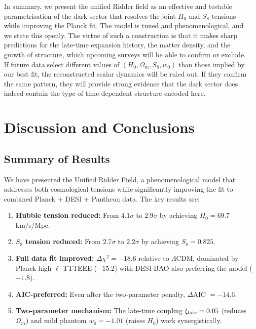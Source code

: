 \documentclass[twocolumn,showpacs,preprintnumbers,amsmath,amssymb,prd]{revtex4-2}
\begin{document}
In summary, we present the unified Ridder field as an effective and testable parametrisation of the dark sector that resolves the joint $H_0$ and $S_8$ tensions while improving the Planck fit. The model is tuned and phenomenological, and we state this openly. The virtue of such a construction is that it makes sharp predictions for the late-time expansion history, the matter density, and the growth of structure, which upcoming surveys will be able to confirm or exclude. If future data select different values of $(H_0, \Omega_m, S_8, w_0)$ than those implied by our best fit, the reconstructed scalar dynamics will be ruled out. If they confirm the same pattern, they will provide strong evidence that the dark sector does indeed contain the type of time-dependent structure encoded here.

\section{Discussion and Conclusions}
\label{sec:discussion}

\subsection{Summary of Results}

We have presented the Unified Ridder Field, a phenomenological model that addresses both cosmological tensions while significantly improving the fit to combined Planck + DESI + Pantheon data. The key results are:

\begin{enumerate}
    \item \textbf{Hubble tension reduced:} From $4.1\sigma$ to $2.9\sigma$ by achieving $H_0 = 69.7$ km/s/Mpc.
    
    \item \textbf{$S_8$ tension reduced:} From $2.7\sigma$ to $2.2\sigma$ by achieving $S_8 = 0.825$.
    
    \item \textbf{Full data fit improved:} $\Delta\chi^2 = -18.6$ relative to $\Lambda$CDM, dominated by Planck high-$\ell$ TTTEEE ($-15.2$) with DESI BAO also preferring the model ($-1.8$).
    
    \item \textbf{AIC-preferred:} Even after the two-parameter penalty, $\Delta$AIC $= -14.6$.
    
    \item \textbf{Two-parameter mechanism:} The late-time coupling $\xi_{\rm late} = 0.05$ (reduces $\Omega_m$) and mild phantom $w_0 = -1.01$ (raises $H_0$) work synergistically.
\end{enumerate}
\end{document}
